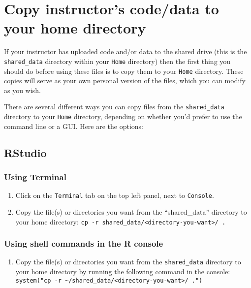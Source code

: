 \documentclass[]{book}
\providecommand{\tightlist}{%
  \setlength{\itemsep}{0pt}\setlength{\parskip}{0pt}}
\begin{document}
\hypertarget{copy-instructors-codedata-to-your-home-directory}{%
\chapter{Copy instructor's code/data to your home directory}\label{copy-instructors-codedata-to-your-home-directory}}

If your instructor has uploaded code and/or data to the shared drive (this is the \texttt{shared\_data} directory within your \texttt{Home} directory) then the first thing you should do before using these files is to copy them to your \texttt{Home} directory. These copies will serve as your own personal version of the files, which you can modify as you wish.

There are several different ways you can copy files from the \texttt{shared\_data} directory to your \texttt{Home} directory, depending on whether you'd prefer to use the command line or a GUI. Here are the options:

\hypertarget{rstudio-1}{%
\section{RStudio}\label{rstudio-1}}

\hypertarget{using-terminal}{%
\subsection{Using Terminal}\label{using-terminal}}

\begin{enumerate}
\def\labelenumi{\arabic{enumi}.}
\tightlist
\item
  Click on the \texttt{Terminal} tab on the top left panel, next to \texttt{Console}.
\item
  Copy the file(s) or directories you want from the ``shared\_data'' directory to your home directory: \texttt{cp\ -r\ shared\_data/\textless{}directory-you-want\textgreater{}/\ .}
\end{enumerate}

\hypertarget{using-shell-commands-in-the-r-console}{%
\subsection{Using shell commands in the R console}\label{using-shell-commands-in-the-r-console}}

\begin{enumerate}
\def\labelenumi{\arabic{enumi}.}
\tightlist
\item
  Copy the file(s) or directories you want from the \texttt{shared\_data} directory to your home directory by running the following command in the console: \texttt{system("cp\ -r\ \textasciitilde{}/shared\_data/\textless{}directory-you-want\textgreater{}/\ .")}
\end{enumerate}
\end{document}
